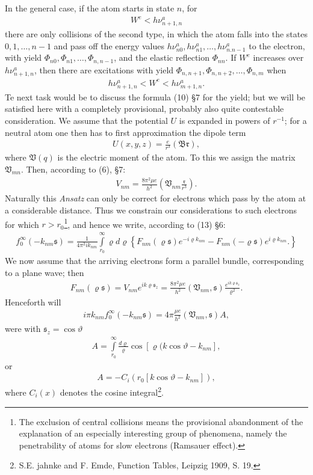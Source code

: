 \documentclass[a4paper,11pt]{article}
\newcommand{\?}[2]{#1\footnote{\textsc{Translator note}: #2}}
\newcommand{\nequ}[2]{\begin{align*}\tag{#1}#2\end{align*}}
\newcommand{\uequ}[1]{\begin{align*}#1\end{align*}}
\renewcommand{\exp}[1]{e^{#1}}
\begin{document}
In the general case, if the atom starts in state $n$, for
\uequ{
W^e < h\nu_{n+1,n}^a
}
there are only collisions of the second type, in which the atom falls into the states $0,1,\dots,n-1$ and pass off the energy values $h\nu_{n0}^a, h\nu_{n1}^a,\dots,h\nu_{n.n-1}^a$
to the electron, with yield $\Phi_{n0}, \Phi_{n1}, \dots, \Phi_{n,n-1}$, and the elastic reflection $\Phi_{nn}$. If $W^e$ increases over $h\nu_{n+1,n}^a$, then there are excitations with yield $\Phi_{n,n+1},\Phi_{n,n+2},\dots,\Phi_{n,m}$ when
\uequ{
h\nu_{n+1,n}^a < W^e < h\nu_{m+1,n}^a.
}
Te next task would be to discuss the formula (10) \S7 for the yield; but we will be satisfied here with a completely provisional, probably also quite contestable consideration. We assume that the potential $U$ is expanded in powers of $r^{-1}$; for a neutral atom one then has to first approximation the dipole term
\nequ{1}{
U(x,y,z) = \frac{e}{r^3}\left(\mathfrak{Br}\right),
}
where $\mathfrak{V}(q)$ is the electric moment of the atom. To this we assign the matrix $\mathfrak{V}_{mn}$. Then, according to (6), \S7:
\nequ{2}{
V_{nm} = \frac{8\pi^2 \mu e}{h^2}\left(\mathfrak{V}_{nm}\frac{\mathfrak{r}}{r^3}\right).
}
Naturally this \textit{Ansatz} can only be correct for electrons which pass by the atom at a considerable distance. Thus we constrain our considerations to such electrons for which $r>r_0$\footnote{The exclusion of central collisions means the provisional abandonment of the explanation of an especially interesting group of phenomena, namely the penetrability of atoms for slow electrons (Ramsauer effect).}, and hence we write, according to (13) \S6:
\uequ{
f_0^\infty(-k_{nm}\mathfrak{s}) = \frac{1}{4\pi^2 ik_{nm}}
\int\limits_{r_0}^\infty \varrho d\varrho\left\{
F_{nm}(\varrho\mathfrak{s})\exp{-i\varrho k_{nm}} - 
F_{nm}(-\varrho\mathfrak{s})\exp{i\varrho k_{nm}}.
\right\}
}
We now assume that the arriving electrons form a parallel bundle, corresponding to a plane wave; then
\uequ{
F_{nm}(\varrho\mathfrak{s}) = V_{nm}\exp{ik\varrho\mathfrak{s}_z} = 
\frac{8\pi^2 \mu e}{h^2}\left(\mathfrak{V}_{nm}, \mathfrak{s}\right)
\frac{\exp{ik\varrho\mathfrak{s}_z}}{\varrho^2}.
}
Henceforth will
\nequ{3}{
i\pi k_{nm} f_0^\infty(-k_{nm}\mathfrak{s}) = 4\pi\frac{\mu e}{h^2}
\left(\mathfrak{V}_{nm},\mathfrak{s}\right)A,
}
were with $\mathfrak{s}_z = \cos\vartheta$
\nequ{4}{
A=\int\limits_{r_0}^\infty \frac{d\varrho}{\varrho}
\cos\left[\varrho (k\cos\vartheta - k_{nm}\right],
}
or
\nequ{5}{
A=-C_i\left(r_0\left[k\cos\vartheta - k_{nm}\right]\right),
}
where $C_i(x)$ denotes the cosine integral\footnote{S.E. jahnke and F. Emde, Function Tables, Leipzig 1909, S. 19.}.
\end{document}
